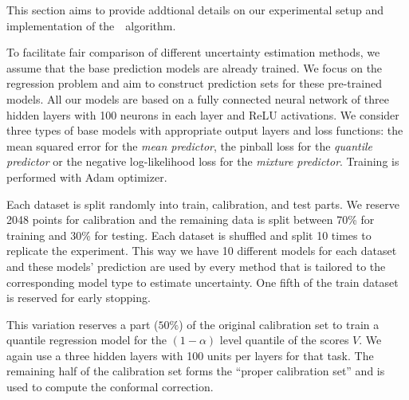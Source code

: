 
  This section aims to provide addtional details on our experimental setup and implementation of the~\RCP\ algorithm.

  To facilitate fair comparison of different uncertainty estimation methods, we assume that the base prediction models are already trained. We focus on the regression problem and aim to construct prediction sets for these pre-trained models. All our models are based on a fully connected neural network of three hidden layers with 100 neurons in each layer and ReLU activations. We consider three types of base models with appropriate output layers and loss functions: the mean squared error for the \textit{mean predictor}, the pinball loss for the \textit{quantile predictor} or the negative log-likelihood loss for the \textit{mixture predictor}. Training is performed with Adam optimizer.

  Each dataset is split randomly into train, calibration, and test parts. We reserve 2048 points for calibration and the remaining data is split between 70\% for training and 30\% for testing. Each dataset is shuffled and split 10 times to replicate the experiment. This way we have 10 different models for each dataset and these models' prediction are used by every method that is tailored to the corresponding model type to estimate uncertainty. One fifth of the train dataset is reserved for early stopping.

  This variation reserves a part ($50\%$) of the original calibration set to train a quantile regression model for the $(1-\alpha)$ level quantile of the scores $V$. We again use a three hidden layers with 100 units per layers for that task. The remaining half of the calibration set forms the ``proper calibration set'' and is used to compute the conformal correction.


